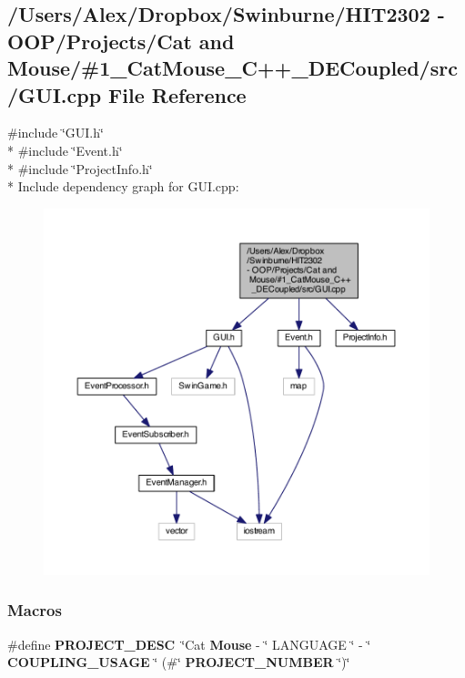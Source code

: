 \subsection{/\-Users/\-Alex/\-Dropbox/\-Swinburne/\-H\-I\-T2302 -\/ O\-O\-P/\-Projects/\-Cat and Mouse/\#1\-\_\-\-Cat\-Mouse\-\_\-\-C++\-\_\-\-D\-E\-Coupled/src/\-G\-U\-I.cpp File Reference}
\label{_g_u_i_8cpp}
{\ttfamily \#include \char`\"{}G\-U\-I.\-h\char`\"{}}\\*
{\ttfamily \#include \char`\"{}Event.\-h\char`\"{}}\\*
{\ttfamily \#include \char`\"{}Project\-Info.\-h\char`\"{}}\\*
Include dependency graph for G\-U\-I.\-cpp\-:
\nopagebreak
\begin{figure}[H]
\begin{center}
\leavevmode
\includegraphics[width=350pt]{_g_u_i_8cpp__incl}
\end{center}
\end{figure}
\subsubsection*{Macros}
\begin{DoxyCompactItemize}
\item 
\#define {\bf P\-R\-O\-J\-E\-C\-T\-\_\-\-D\-E\-S\-C}~\char`\"{}Cat {\bf Mouse} -\/ \char`\"{} L\-A\-N\-G\-U\-A\-G\-E \char`\"{} -\/ \char`\"{} {\bf C\-O\-U\-P\-L\-I\-N\-G\-\_\-\-U\-S\-A\-G\-E} \char`\"{} (\#\char`\"{} {\bf P\-R\-O\-J\-E\-C\-T\-\_\-\-N\-U\-M\-B\-E\-R} \char`\"{})\char`\"{}
\end{DoxyCompactItemize}


